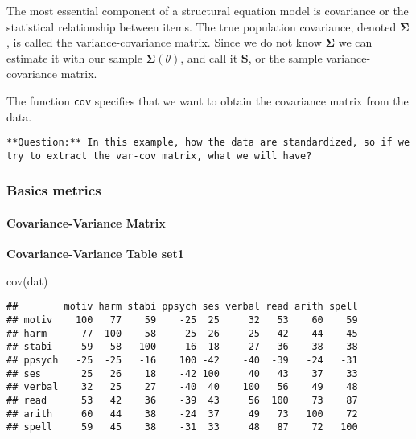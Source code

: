 \documentclass[
]{article}
\newenvironment{Shaded}{\begin{snugshade}}{\end{snugshade}}
\newcommand{\FunctionTok}[1]{\textcolor[rgb]{0.00,0.00,0.00}{#1}}
\newcommand{\NormalTok}[1]{#1}
\begin{document}
The most essential component of a structural equation model is
covariance or the statistical relationship between items. The true
population covariance, denoted \(\mathbf{\Sigma}\), is called the
variance-covariance matrix. Since we do not know \(\mathbf{\Sigma}\) we
can estimate it with our sample \(\mathbf{\Sigma}(\theta)\), and call it
\(\mathbf{S}\), or the sample variance-covariance matrix.

The function \texttt{cov} specifies that we want to obtain the
covariance matrix from the data.

\begin{verbatim}
**Question:** In this example, how the data are standardized, so if we try to extract the var-cov matrix, what we will have?
\end{verbatim}

\hypertarget{basics-metrics}{%
\subsubsection{Basics metrics}\label{basics-metrics}}

\hypertarget{covariance-variance-matrix}{%
\paragraph{Covariance-Variance
Matrix}\label{covariance-variance-matrix}}

\textbf{Covariance-Variance Table set1}

\begin{Shaded}
\begin{Highlighting}[]
\FunctionTok{cov}\NormalTok{(dat)}
\end{Highlighting}
\end{Shaded}

\begin{verbatim}
##        motiv harm stabi ppsych ses verbal read arith spell
## motiv    100   77    59    -25  25     32   53    60    59
## harm      77  100    58    -25  26     25   42    44    45
## stabi     59   58   100    -16  18     27   36    38    38
## ppsych   -25  -25   -16    100 -42    -40  -39   -24   -31
## ses       25   26    18    -42 100     40   43    37    33
## verbal    32   25    27    -40  40    100   56    49    48
## read      53   42    36    -39  43     56  100    73    87
## arith     60   44    38    -24  37     49   73   100    72
## spell     59   45    38    -31  33     48   87    72   100
\end{verbatim}
\end{document}
